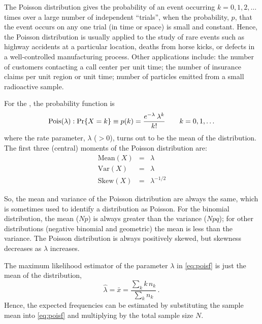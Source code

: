 \documentclass[10pt,krantz2]{krantz}\usepackage[]{graphicx}\usepackage[]{color}
\begin{document}
The Poisson distribution gives the probability of an event occurring
$k = 0, 1, 2, \dots$ times over a large number of independent ``trials'',
when the probability, $p$, that the event occurs on any one
trial (in time or space) is small and constant.
Hence, the Poisson distribution is usually applied to the study of
rare events such as highway accidents at a particular location,
deaths from horse kicks, or defects in a well-controlled manufacturing
process.  Other applications include:
the number of customers contacting a call center per unit time;
the number of insurance claims per unit region or unit time;
number of particles emitted from a small radioactive sample.

For the , the probability function
is
\begin{equation}\label{eq:poisf}
\Pois(\lambda):\Pr \{ X = k \} \equiv p (k)=
  \frac{ e^{ - \lambda } \:  \lambda^k } { k ! }
  \quad\quad k = 0, 1, \dots
\end{equation}
where the rate parameter, $\lambda$ ($>0$), turns out to be the mean of the
distribution.
The first three (central) moments of the Poisson distribution are:
\begin{eqnarray*}
\textrm{Mean}(X) & = & \lambda \\
\textrm{Var}(X) &  = & \lambda \\
\textrm{Skew}(X) & = & \lambda^{- 1/2}
\end{eqnarray*}

So, the mean and variance of the Poisson distribution are always
the same, which is sometimes used to identify a distribution
as Poisson.  For the binomial distribution, the mean ($Np$) is always
greater than the variance ($Npq$); for other distributions
(negative binomial and geometric) the mean is less than the
variance. The Poisson distribution is always positively skewed,
but skewness decreases as $\lambda$ increases.

The maximum likelihood estimator of the parameter \(\lambda\)
in \eqref{eq:poisf} is just
the mean of the distribution,
\begin{equation}
  \hat{\lambda}= \bar{x} = \frac{\sum_k k \,  n_k}{\sum_k  n_k} \label{eq:pois-lambda}
  \period
\end{equation}
Hence, the expected frequencies can be estimated by substituting the
sample mean into \eqref{eq:poisf} and multiplying by the total
sample size $N$.
\end{document}
